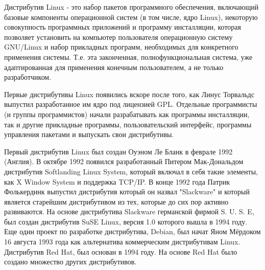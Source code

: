 \documentclass[bachelor, och, referat, times]{SCWorks}
\begin{document}
\par Дистрибутив Linux - это набор пакетов программного обеспечения, включающий базовые компоненты операционной систем (в том числе, ядро Linux), некоторую совокупность программных приложений и программу инсталляции, которая позволяет установить на компьютер пользователя операционную систему GNU/Linux и набор прикладных программ, необходимых для конкретного применения системы. Т.е. эта законченная, полнофункциональная система, уже адаптированная для применения конечным пользователем, а не только разработчиком.
\par Первые дистрибутивы Linux появились вскоре после того, как Линус Торвальдс выпустил разработанное им ядро под лицензией GPL. Отдельные программисты (и группы программистов) начали разрабатывать как программы инсталляции, так и другие прикладные программы, пользовательский интерфейс, программы управления пакетами и выпускать свои дистрибутивы.
\par Первый дистрибутив Linux был создан Оуэном Ле Бланк в феврале 1992 (Англия). В октябре 1992 появился разработанный Питером Мак-Дональдом дистрибутив Softlanding Linux System, который включал в себя такие элементы, как X Window System и поддержка TCP/IP. В конце 1992 года Патрик Фолькердинк выпустил дистрибутив который он назвал "Slackware" и который является старейшим дистрибутивом из тех, которые до сих пор активно развиваются. На основе дистрибутива Slackware германской фирмой S. U. S. E, был создан дистрибутив SuSE Linux, версия 1.0 которого вышла в 1994 году. Еще один проект по разработке дистрибутива, Debian, был начат Яном Мёрдоком 16 августа 1993 года как альтернатива коммерческим дистрибутивам Linux. Дистрибутив Red Hat, был основан в 1994 году. На основе Red Hat было создано множество других дистрибутивов.
\end{document}
